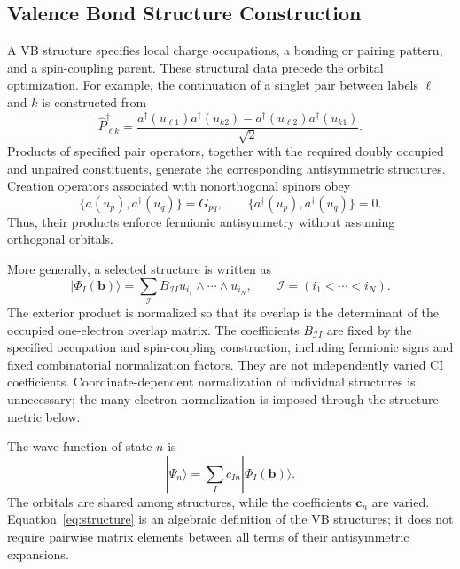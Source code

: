 \documentclass[12pt]{article}
\begin{document}
\subsection{Valence Bond Structure Construction}

A VB structure specifies local charge occupations, a bonding or pairing pattern, and a spin-coupling parent. These structural data precede the orbital optimization.\cite{gerratt1997} For example, the continuation of a singlet pair between labels \(\ell\) and \(k\) is constructed from
\begin{equation}
 \hat P_{\ell k}^\dagger=
 \frac{a^\dagger(u_{\ell1})a^\dagger(u_{k2})
       -a^\dagger(u_{\ell2})a^\dagger(u_{k1})}{\sqrt2}.
 \label{eq:singletpair}
\end{equation}
Products of specified pair operators, together with the required doubly occupied and unpaired constituents, generate the corresponding antisymmetric structures. Creation operators associated with nonorthogonal spinors obey
\begin{equation}
 \{a(u_p),a^\dagger(u_q)\}=G_{pq},
 \qquad \{a^\dagger(u_p),a^\dagger(u_q)\}=0.
 \label{eq:nonorthalgebra}
\end{equation}
Thus, their products enforce fermionic antisymmetry without assuming orthogonal orbitals.

More generally, a selected structure is written as
\begin{equation}
 |\Phi_I(\mathbf b)\rangle
 =\sum_{\mathcal I}B_{\mathcal I I}
   u_{i_1}\wedge\cdots\wedge u_{i_N},
 \qquad \mathcal I=(i_1<\cdots<i_N).
 \label{eq:structure}
\end{equation}
The exterior product is normalized so that its overlap is the determinant of the occupied one-electron overlap matrix. The coefficients \(B_{\mathcal I I}\) are fixed by the specified occupation and spin-coupling construction, including fermionic signs and fixed combinatorial normalization factors. They are not independently varied CI coefficients. Coordinate-dependent normalization of individual structures is unnecessary; the many-electron normalization is imposed through the structure metric below.

The wave function of state \(n\) is
\begin{equation}
 |\Psi_n\rangle=\sum_I c_{In}|\Phi_I(\mathbf b)\rangle.
 \label{eq:wavefunction}
\end{equation}
The orbitals are shared among structures, while the coefficients \(\mathbf c_n\) are varied. Equation~\eqref{eq:structure} is an algebraic definition of the VB structures; it does not require pairwise matrix elements between all terms of their antisymmetric expansions.
\end{document}
